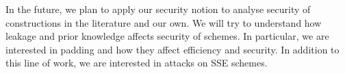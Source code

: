 In the future, we plan to apply our security notion to analyse security of constructions in the literature and our own. We will try to understand how leakage and prior knowledge affects security of schemes. In particular, we are interested in padding and how they affect efficiency and security. In addition to this line of work, we are interested in attacks on SSE schemes. 
